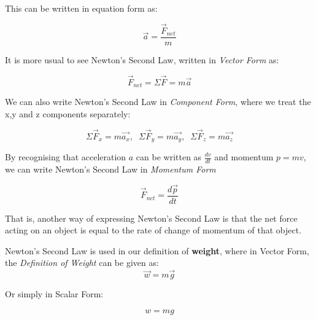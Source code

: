 \documentclass[12pt, letterpaper, twoside]{article}
\begin{document}
This can be written in equation form as:

\begin{equation}
\overrightarrow{a} = \frac{\overrightarrow{F}_{net}}{m}
\end{equation}

\bigskip

It is more usual to see Newton's Second Law, written in \emph{Vector Form} as:


\begin{equation}
\overrightarrow{F}_{net} = \Sigma \overrightarrow{F} = m \overrightarrow{a}
\end{equation}




\bigskip

We can also write Newton's Second Law in \emph{Component Form}, where we treat the x,y and z components separately:

\begin{equation}
\Sigma \overrightarrow{F}_x = m \overrightarrow{a_x},\;\; \Sigma \overrightarrow{F}_y = m \overrightarrow{a_y}, \;\;\Sigma \overrightarrow{F}_z = m \overrightarrow{a_z}
\end{equation}


\bigskip

By recognising that acceleration $a$ can be written as $\frac{dv}{dt}$ and momentum $p = mv$, we can write Newton's Second Law in \emph{Momentum Form} 

\begin{equation}
\overrightarrow{F}_{net} = \frac{d \overrightarrow{p}}{dt}
\end{equation}

\bigskip

That is, another way of expressing Newton's Second Law is that the net force acting on an object is equal to the rate of change of momentum of that object. 


\bigskip

Newton's Second Law is used in our definition of \textbf{weight}, where in Vector Form, the\emph{ Definition of Weight} can be given as:
\begin{equation}
\overrightarrow{w} = m \overrightarrow{g}
\end{equation} 

\bigskip

Or simply in Scalar Form:

\begin{equation}
w = mg
\end{equation}
\end{document}
